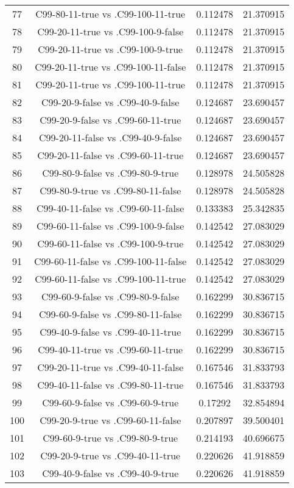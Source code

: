 \documentclass[a4paper,10pt]{article}
\begin{document}
\begin{landscape}
\begin{table}[!htp]
\begin{tabular}{cccc}
77&C99-80-11-true vs .C99-100-11-true&0.112478&21.370915\\
78&C99-20-11-true vs .C99-100-9-false&0.112478&21.370915\\
79&C99-20-11-true vs .C99-100-9-true&0.112478&21.370915\\
80&C99-20-11-true vs .C99-100-11-false&0.112478&21.370915\\
81&C99-20-11-true vs .C99-100-11-true&0.112478&21.370915\\
82&C99-20-9-false vs .C99-40-9-false&0.124687&23.690457\\
83&C99-20-9-false vs .C99-60-11-true&0.124687&23.690457\\
84&C99-20-11-false vs .C99-40-9-false&0.124687&23.690457\\
85&C99-20-11-false vs .C99-60-11-true&0.124687&23.690457\\
86&C99-80-9-false vs .C99-80-9-true&0.128978&24.505828\\
87&C99-80-9-true vs .C99-80-11-false&0.128978&24.505828\\
88&C99-40-11-false vs .C99-60-11-false&0.133383&25.342835\\
89&C99-60-11-false vs .C99-100-9-false&0.142542&27.083029\\
90&C99-60-11-false vs .C99-100-9-true&0.142542&27.083029\\
91&C99-60-11-false vs .C99-100-11-false&0.142542&27.083029\\
92&C99-60-11-false vs .C99-100-11-true&0.142542&27.083029\\
93&C99-60-9-false vs .C99-80-9-false&0.162299&30.836715\\
94&C99-60-9-false vs .C99-80-11-false&0.162299&30.836715\\
95&C99-40-9-false vs .C99-40-11-true&0.162299&30.836715\\
96&C99-40-11-true vs .C99-60-11-true&0.162299&30.836715\\
97&C99-20-11-true vs .C99-40-11-false&0.167546&31.833793\\
98&C99-40-11-false vs .C99-80-11-true&0.167546&31.833793\\
99&C99-60-9-false vs .C99-60-9-true&0.17292&32.854894\\
100&C99-20-9-true vs .C99-60-11-false&0.207897&39.500401\\
101&C99-60-9-true vs .C99-80-9-true&0.214193&40.696675\\
102&C99-20-9-true vs .C99-40-11-true&0.220626&41.918859\\
103&C99-40-9-false vs .C99-40-9-true&0.220626&41.918859\\

\end{tabular}
\end{table}
\end{landscape}
\end{document}
